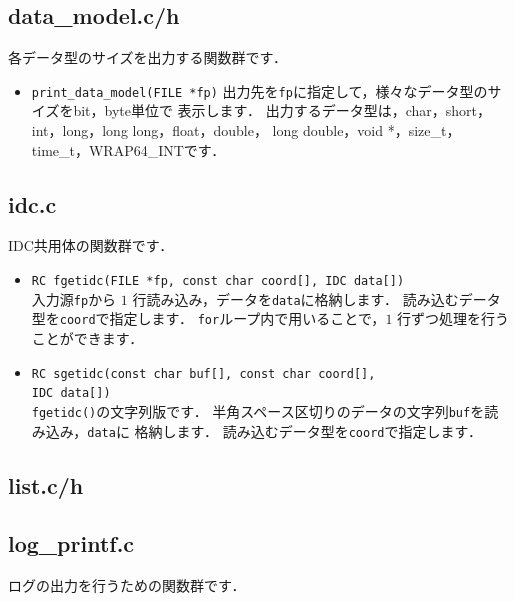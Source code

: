 \subsection{data\_model.c/h}
各データ型のサイズを出力する関数群です．

\begin{itemize}
\item \texttt{print\_data\_model(FILE *fp)}
出力先を\texttt{fp}に指定して，様々なデータ型のサイズをbit，byte単位で
表示します．
出力するデータ型は，char，short，int，long，long long，float，double，
long double，void *，size\_t，time\_t，WRAP64\_INTです．
\end{itemize}

\subsection{idc.c}
IDC共用体の関数群です．

\begin{itemize}
\item \texttt{RC fgetidc(FILE *fp, const char coord[], IDC data[])} \ \\
入力源\texttt{fp}から $1$ 行読み込み，データを\texttt{data}に格納します．
読み込むデータ型を\texttt{coord}で指定します．
\texttt{for}ループ内で用いることで，$1$ 行ずつ処理を行うことができます．

\item \texttt{RC sgetidc(const char buf[], const char coord[], \\
	IDC data[])} \ \\
\texttt{fgetidc()}の文字列版です．
半角スペース区切りのデータの文字列\texttt{buf}を読み込み，\texttt{data}に
格納します．
読み込むデータ型を\texttt{coord}で指定します．
\end{itemize}

\subsection{list.c/h}

\subsection{log\_printf.c}
ログの出力を行うための関数群です．

